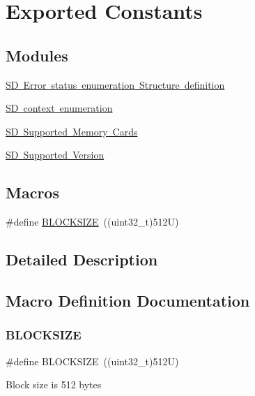 \hypertarget{group___s_d___exported___constants}{}\section{Exported Constants}
\label{group___s_d___exported___constants}
\subsection*{Modules}
\begin{DoxyCompactItemize}
\item 
\mbox{\hyperlink{group___s_d___exported___constansts___group1}{S\+D Error status enumeration Structure definition}}
\item 
\mbox{\hyperlink{group___s_d___exported___constansts___group2}{S\+D context enumeration}}
\item 
\mbox{\hyperlink{group___s_d___exported___constansts___group3}{S\+D Supported Memory Cards}}
\item 
\mbox{\hyperlink{group___s_d___exported___constansts___group4}{S\+D Supported Version}}
\end{DoxyCompactItemize}
\subsection*{Macros}
\begin{DoxyCompactItemize}
\item 
\#define \mbox{\hyperlink{group___s_d___exported___constants_gafcf795f5a96fd55561abe69f56224630}{B\+L\+O\+C\+K\+S\+I\+ZE}}~((uint32\+\_\+t)512\+U)
\end{DoxyCompactItemize}


\subsection{Detailed Description}


\subsection{Macro Definition Documentation}
\mbox{\label{group___s_d___exported___constants_gafcf795f5a96fd55561abe69f56224630}} 
\subsubsection{\texorpdfstring{BLOCKSIZE}{BLOCKSIZE}}
{\footnotesize\ttfamily \#define B\+L\+O\+C\+K\+S\+I\+ZE~((uint32\+\_\+t)512\+U)}

Block size is 512 bytes 